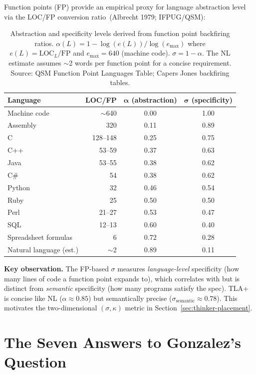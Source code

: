 \documentclass[11pt, a4paper, logo, copyright]{googledeepmind}
\begin{document}
Function points (FP) provide an empirical proxy for language abstraction level via the LOC/FP conversion ratio~(Albrecht 1979; IFPUG/QSM):

\begin{table}[H]
\centering
\small
\begin{tabular}{lrcc}
\toprule
\textbf{Language} & \textbf{LOC/FP} & $\boldsymbol{\alpha}$ \textbf{(abstraction)} & $\boldsymbol{\sigma}$ \textbf{(specificity)} \\
\midrule
Machine code & $\sim$640 & 0.00 & 1.00 \\
Assembly & 320 & 0.11 & 0.89 \\
C & 128--148 & 0.25 & 0.75 \\
C++ & 53--59 & 0.37 & 0.63 \\
Java & 53--55 & 0.38 & 0.62 \\
C\# & 54 & 0.38 & 0.62 \\
Python & 32 & 0.46 & 0.54 \\
Ruby & 25 & 0.50 & 0.50 \\
Perl & 21--27 & 0.53 & 0.47 \\
SQL & 12--13 & 0.60 & 0.40 \\
Spreadsheet formulas & 6 & 0.72 & 0.28 \\
Natural language (est.) & $\sim$2 & 0.89 & 0.11 \\
\bottomrule
\end{tabular}
\caption{Abstraction and specificity levels derived from function point backfiring ratios. $\alpha(L) = 1 - \log(e(L)) / \log(e_{\max})$ where $e(L) = \text{LOC}_L / \text{FP}$ and $e_{\max} = 640$ (machine code). $\sigma = 1 - \alpha$. The NL estimate assumes $\sim$2 words per function point for a concise requirement. Source: QSM Function Point Languages Table; Capers Jones backfiring tables.}
\label{tab:fp-ratios}
\end{table}

\textbf{Key observation.} The FP-based $\sigma$ measures \emph{language-level} specificity (how many lines of code a function point expands to), which correlates with but is distinct from \emph{semantic} specificity (how many programs satisfy the spec). TLA+ is concise like NL ($\alpha \approx 0.85$) but semantically precise ($\sigma_{\text{semantic}} \approx 0.78$). This motivates the two-dimensional $(\sigma, \kappa)$ metric in Section~\ref{sec:thinker-placement}.


\section{The Seven Answers to Gonzalez's Question}
\label{app:seven-answers}
\end{document}
